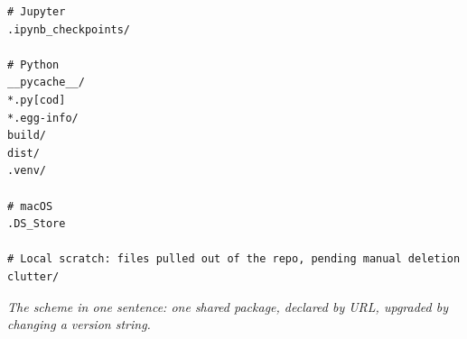 \documentclass[11pt,a4paper]{article}
\begin{document}
\begin{lstlisting}[style=plain]
# Jupyter
.ipynb_checkpoints/

# Python
__pycache__/
*.py[cod]
*.egg-info/
build/
dist/
.venv/

# macOS
.DS_Store

# Local scratch: files pulled out of the repo, pending manual deletion
clutter/
\end{lstlisting}

\vfill
\begin{center}
\small\itshape
The scheme in one sentence: one shared package, declared by URL, upgraded by
changing a version string.
\end{center}
\end{document}
